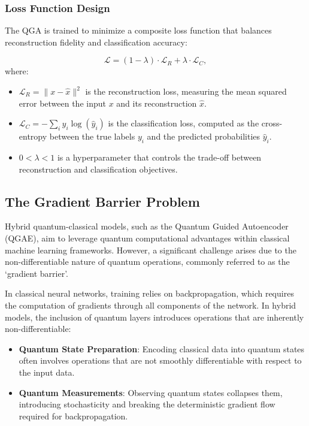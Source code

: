 \documentclass[conference]{IEEEtran}
\begin{document}
\subsubsection{Loss Function Design}
The QGA is trained to minimize a composite loss 
function that balances reconstruction fidelity and 
classification accuracy:

\begin{equation}
    \mathcal{L} = (1-\lambda) \cdot \mathcal{L}_R + \lambda \cdot \mathcal{L}_{C},
    \label{eq:composed_loss_function}
\end{equation}
where:
\begin{itemize}
    \item \( \mathcal{L}_R = \| x - \hat{x} \|^2 \) is the reconstruction loss, measuring the mean squared error between the input \( x \) and its reconstruction \( \hat{x} \).
    \item \( \mathcal{L}_C = -\sum_i y_i \log(\hat{y}_i) \) is the classification loss, computed as the cross-entropy between the true labels \( y_i \) and the predicted probabilities \( \hat{y}_i \).
    \item \( 0 < \lambda < 1 \) is a hyperparameter that controls the trade-off between reconstruction and classification objectives.
\end{itemize}    



\subsection{The Gradient Barrier Problem}
Hybrid quantum-classical models, such as the Quantum Guided Autoencoder 
(QGAE), aim to leverage quantum computational advantages within 
classical machine learning frameworks. However, a significant 
challenge arises due to the non-differentiable nature of quantum 
operations, commonly referred to as the `gradient barrier'.

In classical neural networks, training relies on backpropagation, 
which requires the computation of gradients through all components 
of the network. In hybrid models, the inclusion of quantum 
layers introduces operations that are inherently non-differentiable:

\begin{itemize}
    \item \textbf{Quantum State Preparation}: 
    Encoding classical data into 
    quantum states often involves operations 
    that are not smoothly differentiable with 
    respect to the input data.
    
    \item \textbf{Quantum Measurements}:
    Observing quantum states collapses them, 
    introducing stochasticity and breaking the 
    deterministic gradient flow required 
    for backpropagation.
\end{itemize}
\end{document}
